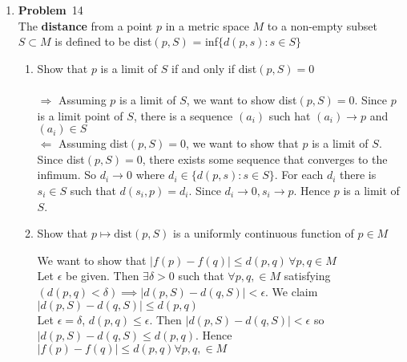 \documentclass[12pt]{amsart}
\newcommand{\benu}{\begin{enumerate}}
\newcommand{\eenu}{\end{enumerate}}
\theoremstyle{definition}
\newcommand{\ep}{\epsilon}
\newcommand{\itep}{\item {\bfseries Problem}\ }
\begin{document}
\begin{enumerate}[series=p]
\begin{comment}
\textbf{Definition - Continuous III }
	A function $f:M \to N$ is \textbf{continuous} if it satisfies the $\boldsymbol{\epsilon, \delta}$ \textbf{condition}:
	$\forall \epsilon > 0 \text{ and } \forall p \in M \, \exists \delta > 0 \text{ such that }$:
	$$q \in M \text{and } d(p,q) < \delta \implies d(fp,fq) < \epsilon$$


\textbf{Definition - Continuous IV - Continu-ish}
	A function $f:M \to N$ is \textbf{continu-ish} if
	$\forall x \in M \forall \epsilon > 0 \exists \delta > 0 \forall y \in M$,\\
	$$d_M(x,y) < \delta \implies d_N(f(x), f(y)) < \epsilon$$

\textbf{Definition - Homeomorphism}
	If $f: M \to N$ is a bijection and $f$ is continuous and the inverse bijection $f^{-1}:N \to M$ is also continuous then $f$ is a \textbf{homeomorphism}
	($M \cong N$)

\end{comment}

\newpage

\itep  14\\
The \textbf{distance} from a point $p$ in a metric space $M$ to a non-empty subset $S \subset M$ is defined to be dist$(p, S)$ = inf$\{d(p,s) : s \in S\}$
\\
\benu
\item Show that $p$ is a limit of $S$ if and only if dist$(p, S) = 0$\\ %
\\
$\Rightarrow$  Assuming $p$ is a limit of $S$, we want to show dist$(p,S) = 0$.  Since $p$ is a limit point of $S$, there is a sequence $(a_i)$ such hat $(a_i) \to p$ and $(a_i) \in S$
\\
$\Leftarrow$  Assuming dist$(p,S) = 0$, we want to show that $p$ is a limit of $S$.  Since dist$(p, S) = 0$, there exists some sequence that converges to the infimum.  So $d_i \to 0$ where $d_i \in \{d(p, s): s \in S\}$.  For each $d_i$ there is $s_i \in S$ such that $d(s_i, p) = d_i$.  Since $d_i \to 0, s_i \to p$.  Hence $p$ is a limit of $S$.
\\
\item Show that $p \mapsto \text{dist}(p, S)$ is a uniformly continuous function of $p \in M$ %
\\
\begin{comment}

We want to show that $\forall \ep > 0 \, \exists \, \delta > 0 \, \forall x,y \in M$ such that $d(x,y) < \delta \implies |\text{dist}(x,s) - \text{dist}(y,s) < \ep|$\\
\end{comment}
We want to show that $|f(p) - f(q)| \leq d(p,q) \, \forall p,q \in M$\\
Let $\ep$ be given.  Then $\exists \delta > 0$ such that $\forall p, q, \in M$ satisfying $(d(p,q) < \delta) \implies |d(p, S) - d(q, S)| < \ep$.  We claim $|d(p, S) - d(q, S)| \leq d(p, q)$\\
Let $\epsilon = \delta$, $d(p,q) \leq \epsilon$.  Then $|d(p,S) - d(q,S)| < \ep$ so $|d(p, S) - d(q, S) \leq d(p,q)$.  Hence $|f(p) - f(q)| \leq d(p,q) \forall p,q, \in M$ 
\eenu
\begin{comment}


\end{comment}
\end{enumerate}
\end{document}
